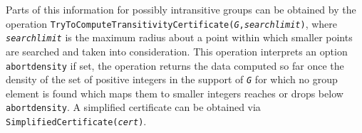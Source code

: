 \documentclass[a4paper,11pt]{report}
\begin{document}
{{\begin{description}
\end{description}
 Parts of this information for possibly intransitive groups can be obtained by
the operation \texttt{TryToComputeTransitivityCertificate(\mbox{\texttt{\mdseries\slshape G}},\mbox{\texttt{\mdseries\slshape searchlimit}})}, where \mbox{\texttt{\mdseries\slshape searchlimit}} is the maximum radius about a point within which smaller points are searched
and taken into consideration. This operation interprets an option \texttt{abortdensity} \texttt{}\texttt{} if set, the operation returns the
data computed so far once the density of the set of positive integers in the
support of \mbox{\texttt{\mdseries\slshape G}} for which no group element is found which maps them to smaller integers
reaches or drops below \texttt{abortdensity}. A simplified certificate can be obtained via \texttt{SimplifiedCertificate(\mbox{\texttt{\mdseries\slshape cert}})}. 
\begin{Verbatim}[commandchars=!@|,fontsize=\small,frame=single,label=Example]
  

\end{Verbatim}}}
\end{document}
